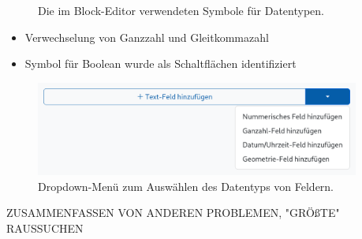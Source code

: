 \begin{frame}

  \begin{figure}
    
    \caption{Die im Block-Editor verwendeten Symbole für Datentypen.}
  \end{figure}

  \begin{itemize}
    \item Verwechselung von Ganzzahl und Gleitkommazahl
    \item Symbol für Boolean wurde als Schaltflächen identifiziert
  \end{itemize}


\end{frame}

\begin{frame}

  \begin{figure}
    \begin{center}
      \includegraphics[width=0.95\textwidth]{assets/datatype-dropdown.png}
    \end{center}
    \caption{Dropdown-Menü zum Auswählen des Datentyps von Feldern.}
  \end{figure}

\end{frame}

\begin{frame}

  ZUSAMMENFASSEN VON ANDEREN PROBLEMEN, "GRÖßTE" RAUSSUCHEN

\end{frame}
